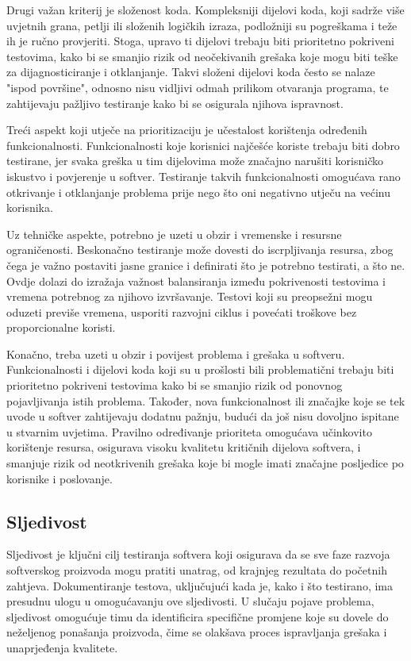 Drugi važan kriterij je složenost koda.
Kompleksniji dijelovi koda, koji sadrže više uvjetnih grana, petlji ili složenih logičkih izraza, podložniji su pogreškama i teže ih je ručno provjeriti.
Stoga, upravo ti dijelovi trebaju biti prioritetno pokriveni testovima, kako bi se smanjio rizik od neočekivanih grešaka koje mogu biti teške za dijagnosticiranje i otklanjanje.
Takvi složeni dijelovi koda često se nalaze "ispod površine", odnosno nisu vidljivi odmah prilikom otvaranja programa, te zahtijevaju pažljivo testiranje kako bi se osigurala njihova ispravnost.

Treći aspekt koji utječe na prioritizaciju je učestalost korištenja određenih funkcionalnosti.
Funkcionalnosti koje korisnici najčešće koriste trebaju biti dobro testirane, jer svaka greška u tim dijelovima može značajno narušiti korisničko iskustvo i povjerenje u softver.
Testiranje takvih funkcionalnosti omogućava rano otkrivanje i otklanjanje problema prije nego što oni negativno utječu na većinu korisnika.

Uz tehničke aspekte, potrebno je uzeti u obzir i vremenske i resursne ograničenosti.
Beskonačno testiranje može dovesti do iscrpljivanja resursa, zbog čega je važno postaviti jasne granice i definirati što je potrebno testirati, a što ne.
Ovdje dolazi do izražaja važnost balansiranja između pokrivenosti testovima i vremena potrebnog za njihovo izvršavanje.
Testovi koji su preopsežni mogu oduzeti previše vremena, usporiti razvojni ciklus i povećati troškove bez proporcionalne koristi.

Konačno, treba uzeti u obzir i povijest problema i grešaka u softveru.
Funkcionalnosti i dijelovi koda koji su u prošlosti bili problematični trebaju biti prioritetno pokriveni testovima kako bi se smanjio rizik od ponovnog pojavljivanja istih problema.
Također, nova funkcionalnost ili značajke koje se tek uvode u softver zahtijevaju dodatnu pažnju, budući da još nisu dovoljno ispitane u stvarnim uvjetima.
Pravilno određivanje prioriteta omogućava učinkovito korištenje resursa, osigurava visoku kvalitetu kritičnih dijelova softvera, i smanjuje rizik od neotkrivenih grešaka koje bi mogle imati značajne posljedice po korisnike i poslovanje.

\subsection*{Sljedivost}
Sljedivost je ključni cilj testiranja softvera koji osigurava da se sve faze razvoja softverskog proizvoda mogu pratiti unatrag, od krajnjeg rezultata do početnih zahtjeva.
Dokumentiranje testova, uključujući kada je, kako i što testirano, ima presudnu ulogu u omogućavanju ove sljedivosti.
U slučaju pojave problema, sljedivost omogućuje timu da identificira specifične promjene koje su dovele do neželjenog ponašanja proizvoda, čime se olakšava proces ispravljanja grešaka i unaprjeđenja kvalitete.

